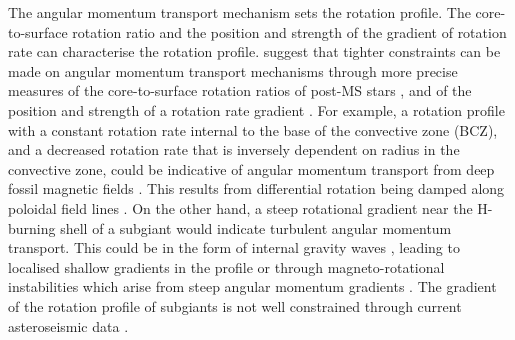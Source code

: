 

The angular momentum transport mechanism sets the rotation profile. The core-to-surface rotation ratio and the position and strength of the gradient of rotation rate can characterise the rotation profile. \citet{fellay_asteroseismology_2021} suggest that tighter constraints can be made on angular momentum transport mechanisms through more precise measures of the core-to-surface rotation ratios of post-MS stars \citep{deheuvels_seismic_2014}, and of the position and strength of a rotation rate gradient \citep{di_mauro_rotational_2018}. For example, a rotation profile with a constant rotation rate internal to the base of the convective zone (BCZ), and a decreased rotation rate that is inversely dependent on radius in the convective zone, could be indicative of angular momentum transport from deep fossil magnetic fields \citep{gough_effect_1990,kissin_rotation_2015,takahashi_modeling_2021}. This results from differential rotation being damped along poloidal field lines \citep{garaud_rotationally_2002, strugarek_magnetic_2011}. On the other hand, a steep rotational gradient near the H-burning shell of a subgiant would indicate turbulent angular momentum transport. This could be in the form of internal gravity waves \citep{pincon_can_2017}, leading to localised shallow gradients in the profile \citep{charbonnel_influence_2005} or through magneto-rotational instabilities which arise from steep angular momentum gradients \citep{spada_angular_2016,balbus_stability_1994,arlt_differential_2003,menou_magnetorotational_2006}. The gradient of the rotation profile of subgiants is not well constrained through current asteroseismic data \citep{deheuvels_seismic_2014}. 

